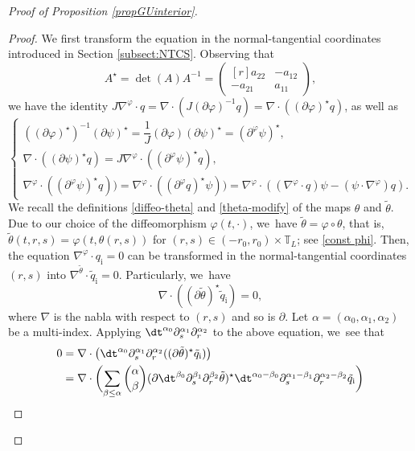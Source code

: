 \begin{proof}[Proof of Proposition \ref{propGUinterior}]
\begin{proof}
We first transform the equation in the normal-tangential coordinates introduced in Section \ref{subsect:NTCS}.
Observing that
\[
A^\star = \det(A)A^{-1} =
\begin{pmatrix*}[r]
a_{22} & -a_{12} \\
-a_{21} & a_{11}
\end{pmatrix*},
\]
we have the identity $J\nabla^\varphi\cdot q = \nabla\cdot(J(\partial\varphi)^{-1}q) = \nabla\cdot((\partial\varphi)^\star q)$, as well as
\begin{equation}\label{F4}
\begin{cases}
((\partial\varphi)^\star)^{-1}(\partial\psi)^\star = \dfrac{1}{J}(\partial\varphi)(\partial\psi)^\star = (\partial^\varphi\psi)^\star, \\
\nabla\cdot((\partial\psi)^\star q) = J\nabla^\varphi\cdot((\partial^\varphi\psi)^\star q), \\
\nabla^\varphi\cdot((\partial^\varphi\psi)^\star q)) = \nabla^\varphi\cdot((\partial^\varphi q)^\star \psi))
= \nabla^\varphi\cdot((\nabla^\varphi\cdot q)\psi - (\psi\cdot\nabla^\varphi)q).
\end{cases}
\end{equation}
We recall the definitions \eqref{diffeo-theta} and \eqref{theta-modify} of the maps $\theta$ and $\tilde{\theta}$.
Due to our choice of the diffeomorphism $\varphi(t,\cdot)$, we~have $\tilde{\theta}=\varphi\circ\theta$, that is,
$\tilde{\theta}(t,r,s)=\varphi(t,\theta(r,s))$ for $(r,s)\in(-r_0,r_0)\times\mathbb{T}_L$; see \eqref{const phi}.
Then, the equation $\nabla^\varphi\cdot q_\mathrm{i}=0$ can be transformed in the normal-tangential coordinates $(r,s)$ into
$\nabla^{\tilde{\theta}}\cdot\tilde{q}_\mathrm{i}=0$.
Particularly, we~have
\[
\nabla\cdot((\partial\tilde{\theta})^\star\tilde{q}_\mathrm{i}) = 0,
\]
where $\nabla$ is the nabla with respect to $(r,s)$ and so is $\partial$.
Let $\alpha=(\alpha_0,\alpha_1,\alpha_2)$ be a multi-index.
Applying $\dt^{\alpha_0}\partial_s^{\alpha_1}\partial_r^{\alpha_2}$ to the above equation, we~see that
\begin{align*}
0 &= \nabla\cdot\bigl(\dt^{\alpha_0}\partial_s^{\alpha_1}\partial_r^{\alpha_2}((\partial\tilde{\theta})^\star\tilde{q}_\mathrm{i}) \bigr) \\
&= \nabla\cdot\biggl(\sum_{\beta\leq\alpha} \binom{\alpha}{\beta}
(\partial\dt^{\beta_0}\partial_s^{\beta_1}\partial_r^{\beta_2}\tilde{\theta})^\star
\dt^{\alpha_0-\beta_0}\partial_s^{\alpha_1-\beta_1}\partial_r^{\alpha_2-\beta_2}\tilde{q}_\mathrm{i} \biggr) \\

\end{align*}
\end{proof}
\end{proof}
